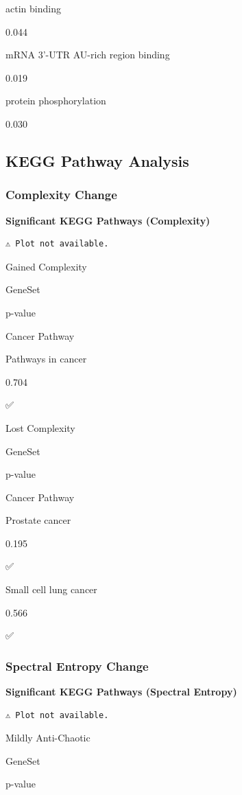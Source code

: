 \documentclass[
  letterpaper,
  DIV=11,
  numbers=noendperiod,
  openany,
  oneside]{scrreprt}
\begin{document}
actin binding

0.044

mRNA 3'-UTR AU-rich region binding

0.019

protein phosphorylation

0.030

\subsection{KEGG Pathway Analysis}

\subsubsection{Complexity Change}

\textbf{Significant KEGG Pathways (Complexity)}

\begin{verbatim}
⚠️ Plot not available.
\end{verbatim}

Gained Complexity

GeneSet

p-value

Cancer Pathway

Pathways in cancer

0.704

✅

Lost Complexity

GeneSet

p-value

Cancer Pathway

Prostate cancer

0.195

✅

Small cell lung cancer

0.566

✅

\subsubsection{Spectral Entropy Change}

\textbf{Significant KEGG Pathways (Spectral Entropy)}

\begin{verbatim}
⚠️ Plot not available.
\end{verbatim}

Mildly Anti-Chaotic

GeneSet

p-value
\end{document}
